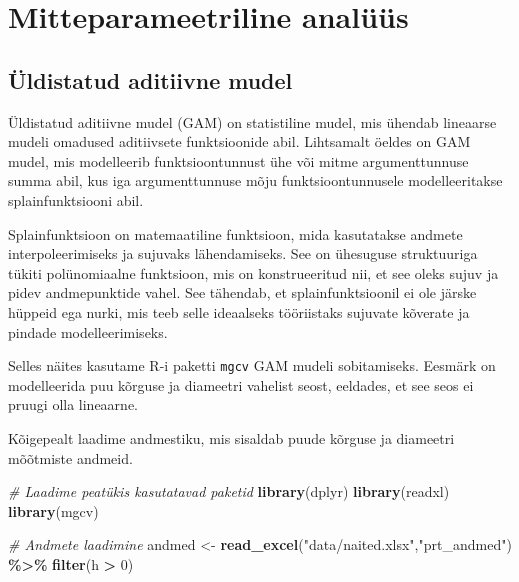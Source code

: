 \documentclass[
]{book}
\newenvironment{Shaded}{\begin{snugshade}}{\end{snugshade}}
\newcommand{\CommentTok}[1]{\textcolor[rgb]{0.56,0.35,0.01}{\textit{#1}}}
\newcommand{\DecValTok}[1]{\textcolor[rgb]{0.00,0.00,0.81}{#1}}
\newcommand{\FunctionTok}[1]{\textcolor[rgb]{0.13,0.29,0.53}{\textbf{#1}}}
\newcommand{\NormalTok}[1]{#1}
\newcommand{\OtherTok}[1]{\textcolor[rgb]{0.56,0.35,0.01}{#1}}
\newcommand{\SpecialCharTok}[1]{\textcolor[rgb]{0.81,0.36,0.00}{\textbf{#1}}}
\newcommand{\StringTok}[1]{\textcolor[rgb]{0.31,0.60,0.02}{#1}}
\renewenvironment{Shaded} {\begin{snugshade}\footnotesize} {\end{snugshade}}
\begin{document}
\chapter{Mitteparameetriline analüüs}\label{mitteparameetriline-analuxfcuxfcs}

\section{Üldistatud aditiivne mudel}\label{uxfcldistatud-aditiivne-mudel}

Üldistatud aditiivne mudel (GAM) on statistiline mudel, mis ühendab lineaarse mudeli omadused aditiivsete funktsioonide abil. Lihtsamalt öeldes on GAM mudel, mis modelleerib funktsioontunnust ühe või mitme argumenttunnuse summa abil, kus iga argumenttunnuse mõju funktsioontunnusele modelleeritakse splainfunktsiooni abil.

Splainfunktsioon on matemaatiline funktsioon, mida kasutatakse andmete interpoleerimiseks ja sujuvaks lähendamiseks. See on ühesuguse struktuuriga tükiti polünomiaalne funktsioon, mis on konstrueeritud nii, et see oleks sujuv ja pidev andmepunktide vahel. See tähendab, et splainfunktsioonil ei ole järske hüppeid ega nurki, mis teeb selle ideaalseks tööriistaks sujuvate kõverate ja pindade modelleerimiseks.

Selles näites kasutame R-i paketti \texttt{mgcv} GAM mudeli sobitamiseks. Eesmärk on modelleerida puu kõrguse ja diameetri vahelist seost, eeldades, et see seos ei pruugi olla lineaarne.

Kõigepealt laadime andmestiku, mis sisaldab puude kõrguse ja diameetri mõõtmiste andmeid.

\begin{Shaded}
\begin{Highlighting}[]
\CommentTok{\# Laadime peatükis kasutatavad paketid}
\FunctionTok{library}\NormalTok{(dplyr)}
\FunctionTok{library}\NormalTok{(readxl)}
\FunctionTok{library}\NormalTok{(mgcv)}
\end{Highlighting}
\end{Shaded}

\begin{Shaded}
\begin{Highlighting}[]
\CommentTok{\# Andmete laadimine}
\NormalTok{andmed }\OtherTok{\textless{}{-}} \FunctionTok{read\_excel}\NormalTok{(}\StringTok{"data/naited.xlsx"}\NormalTok{,}\StringTok{"prt\_andmed"}\NormalTok{) }\SpecialCharTok{\%\textgreater{}\%} \FunctionTok{filter}\NormalTok{(h }\SpecialCharTok{\textgreater{}} \DecValTok{0}\NormalTok{)}
\end{Highlighting}
\end{Shaded}
\end{document}
